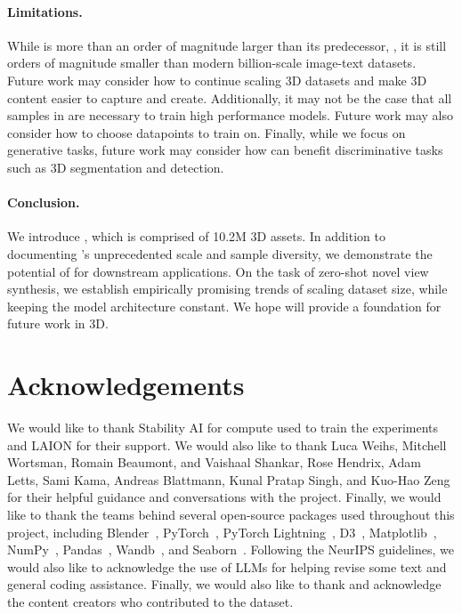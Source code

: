 \paragraph{Limitations.}
While \dataset is more than an order of magnitude larger than its predecessor, \datasetone, it is still orders of magnitude smaller than modern billion-scale image-text datasets. Future work may consider how to continue scaling 3D datasets and make 3D content easier to capture and create. Additionally, it may not be the case that all samples in \dataset are necessary to train high performance models. Future work may also consider how to choose datapoints to train on. Finally, while we focus on generative tasks, future work may consider how \dataset can benefit discriminative tasks such as 3D segmentation and detection.

\vspace*{-2mm}
\paragraph{Conclusion.}
We introduce \dataset, which is comprised of 10.2M 3D assets.
In addition to documenting \dataset's unprecedented scale and sample diversity, we demonstrate the potential of \dataset for downstream applications.
On the task of zero-shot novel view synthesis, we establish empirically promising trends of scaling dataset size, while keeping the model architecture constant.
We hope \dataset will provide a foundation for future work in 3D.
\clearpage

\section*{Acknowledgements}

We would like to thank Stability AI for compute used to train the experiments and LAION for their support. We would also like to thank Luca Weihs, Mitchell Wortsman, Romain Beaumont, and Vaishaal Shankar, Rose Hendrix, Adam Letts, Sami Kama, Andreas Blattmann, Kunal Pratap Singh, and Kuo-Hao Zeng for their helpful guidance and conversations with the project. Finally, we would like to thank the teams behind several open-source packages used throughout this project, including Blender~\cite{blender}, PyTorch~\cite{paszke2019pytorch}, PyTorch Lightning~\cite{Falcon_PyTorch_Lightning_2019}, D3~\cite{bostock2011d3}, Matplotlib~\cite{Hunter:2007}, NumPy~\cite{harris2020array}, Pandas~\cite{reback2020pandas}, Wandb~\cite{wandb}, and Seaborn~\cite{Waskom2021}. Following the NeurIPS guidelines, we would also like to acknowledge the use of LLMs for helping revise some text and general coding assistance. Finally, we would also like to thank and acknowledge the content creators who contributed to the dataset.

